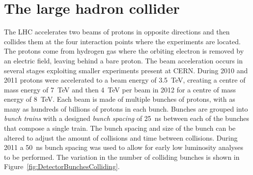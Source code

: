 \section{The large hadron collider} \label{sec:the_large_hadron_collider}

The LHC accelerates two beams of protons in opposite directions and then collides them at the four interaction points where the experiments are located. The protons come from hydrogen gas where the orbiting electron is removed by an electric field, leaving behind a bare proton. The beam acceleration occurs in several stages exploiting smaller experiments present at CERN. During 2010 and 2011 protons were accelerated to a beam energy of \SI{3.5}{\TeV}, creating a centre of mass energy of \SI{7}{\TeV} and then \SI{4}{\TeV} per beam in 2012 for a centre of mass energy of \SI{8}{\TeV}. Each beam is made of multiple bunches of protons, with as many as hundreds of billions of protons in each bunch. Bunches are grouped into \textit{bunch trains} with a designed \textit{bunch spacing} of \SI{25}{\ns} between each of the bunches that compose a single train. The bunch spacing and size of the bunch can be altered to adjust the amount of collisions and time between collisions. During 2011 a \SI{50}{\ns} bunch spacing was used to allow for early low luminosity analyses to be performed. The variation in the number of colliding bunches is shown in Figure~\ref{fig:DetectorBunchesColliding}.


